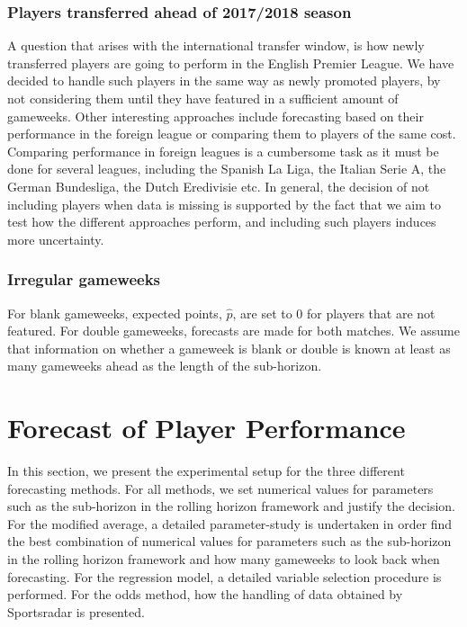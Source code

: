 \subsubsection{Players transferred ahead of 2017/2018 season}
A question that arises with the international transfer window, is how newly transferred players are going to perform in the English Premier League. We have decided to handle such players in the same way as newly promoted players, by not considering them until they have featured in a sufficient amount of gameweeks. Other interesting approaches include forecasting based on their performance in the foreign league or comparing them to players of the same cost. Comparing performance in foreign leagues is a cumbersome task as it must be done for several leagues, including the Spanish La Liga, the Italian Serie A, the German Bundesliga, the Dutch Eredivisie etc. In general, the decision of not including players when data is missing is supported by the fact that we aim to test how the different approaches perform, and including such players induces more uncertainty.


\subsubsection{Irregular gameweeks}
For blank gameweeks, expected points, $\hat{p}$, are set to 0 for players that are not featured. For double gameweeks, forecasts are made for both matches. We assume that information on whether a gameweek is blank or double is known at least as many gameweeks ahead as the length of the sub-horizon.

\newpage

\section{Forecast of Player Performance}
\label{Exp_setup_Player_Performance_Prediction}



In this section, we present the experimental setup for the three different forecasting methods. For all methods, we set numerical values for parameters such as the sub-horizon in the rolling horizon framework and justify the decision. For the modified average, a detailed parameter-study is undertaken in order find the best combination of numerical values for parameters such as the sub-horizon in the rolling horizon framework and how many gameweeks to look back when forecasting. For the regression model, a detailed variable selection procedure is performed. For the odds method, how the handling of data obtained by Sportsradar is presented. 

